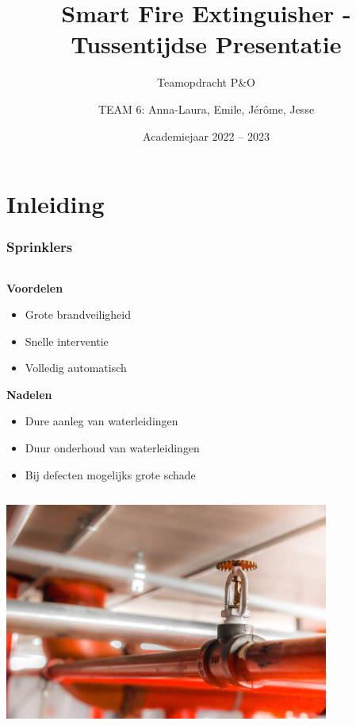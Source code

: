 \documentclass
   [kulak] %
   {kulakbeamer}
\title[Smart Fire Extinguisher]{Smart Fire Extinguisher - Tussentijdse Presentatie}
\subtitle{Teamopdracht P\&O}
\author[Team 6]{TEAM 6: Anna-Laura, Emile, Jérôme, Jesse}
\institute[Kulak]{KU Leuven Kulak}
\date{Academiejaar 2022 -- 2023}
\begin{document}
\begin{titleframe}
\titlepage
\end{titleframe}

\begin{outlineframe}[Overzicht]
\tableofcontents
\end{outlineframe}


\section{Inleiding}

\begin{frame}
\frametitle{Sprinklers} 

\begin{column}{ 0.5 \textwidth}
	{\bf{Voordelen}}\\[.2cm]
	\begin{itemize}
		\item Grote brandveiligheid
		\item Snelle interventie
		\item Volledig automatisch
	\end{itemize}
	{\bf{Nadelen}}\\[.2cm]
	\begin{itemize}
		\item Dure aanleg van waterleidingen
		\item Duur onderhoud van waterleidingen
		\item Bij defecten mogelijks grote schade 
	\end{itemize}
\end{column}
\begin{column}{ 0.5 \textwidth}
	\includegraphics[width=0.8\textwidth]{sprinkler_foto_BEAMER}
\end{column}
\end{frame}
\end{document}
